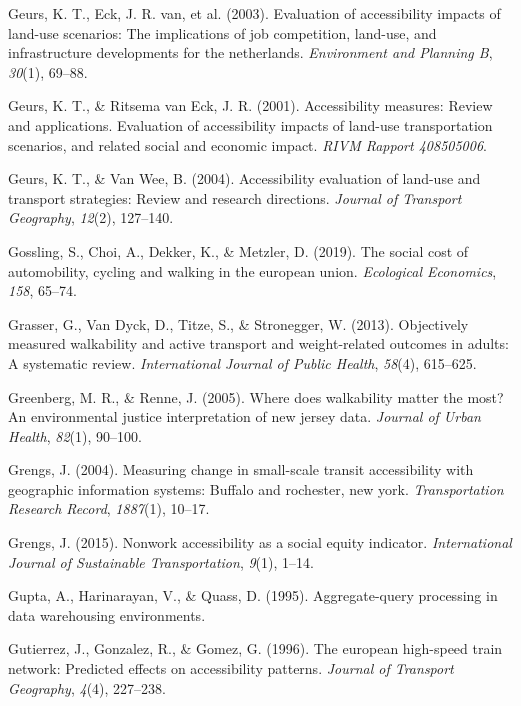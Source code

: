 \documentclass[
11pt, %
oneside, %
english, %
singlespacing, %
]{macthesis} %
\newlength{\cslhangindent}
\newenvironment{CSLReferences}[2] %
 {%
  \setlength{\parindent}{0pt}
  \ifodd #1 \everypar{\setlength{\hangindent}{\cslhangindent}}\ignorespaces\fi
  \ifnum #2 > 0
  \setlength{\parskip}{#2\baselineskip}
  \fi
 }%
 {}
\begin{document}
\begin{CSLReferences}{1}{0}
Geurs, K. T., Eck, J. R. van, et al. (2003). Evaluation of accessibility impacts of land-use scenarios: The implications of job competition, land-use, and infrastructure developments for the netherlands. \emph{Environment and Planning B}, \emph{30}(1), 69--88.

Geurs, K. T., \& Ritsema van Eck, J. R. (2001). Accessibility measures: Review and applications. Evaluation of accessibility impacts of land-use transportation scenarios, and related social and economic impact. \emph{RIVM Rapport 408505006}.

Geurs, K. T., \& Van Wee, B. (2004). Accessibility evaluation of land-use and transport strategies: Review and research directions. \emph{Journal of Transport Geography}, \emph{12}(2), 127--140.

Gossling, S., Choi, A., Dekker, K., \& Metzler, D. (2019). The social cost of automobility, cycling and walking in the european union. \emph{Ecological Economics}, \emph{158}, 65--74.

Grasser, G., Van Dyck, D., Titze, S., \& Stronegger, W. (2013). Objectively measured walkability and active transport and weight-related outcomes in adults: A systematic review. \emph{International Journal of Public Health}, \emph{58}(4), 615--625.

Greenberg, M. R., \& Renne, J. (2005). Where does walkability matter the most? An environmental justice interpretation of new jersey data. \emph{Journal of Urban Health}, \emph{82}(1), 90--100.

Grengs, J. (2004). Measuring change in small-scale transit accessibility with geographic information systems: Buffalo and rochester, new york. \emph{Transportation Research Record}, \emph{1887}(1), 10--17.

Grengs, J. (2015). Nonwork accessibility as a social equity indicator. \emph{International Journal of Sustainable Transportation}, \emph{9}(1), 1--14.

Gupta, A., Harinarayan, V., \& Quass, D. (1995). Aggregate-query processing in data warehousing environments.

Gutierrez, J., Gonzalez, R., \& Gomez, G. (1996). The european high-speed train network: Predicted effects on accessibility patterns. \emph{Journal of Transport Geography}, \emph{4}(4), 227--238.


\end{CSLReferences}
\end{document}
